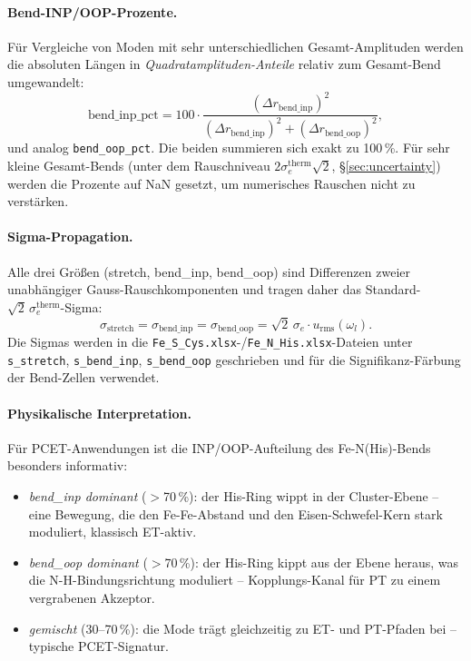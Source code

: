 \documentclass[11pt,a4paper,twoside]{article}
\newcommand{\urms}{u_{\mathrm{rms}}}
\theoremstyle{remark}
\begin{document}
\paragraph{Bend-INP/OOP-Prozente.}
F\"ur Vergleiche von Moden mit sehr unterschiedlichen
Gesamt-Amplituden werden die absoluten L\"angen in
\emph{Quadratamplituden-Anteile} relativ zum Gesamt-Bend umgewandelt:
\begin{equation}
  \text{bend\_inp\_pct} = 100 \cdot
     \frac{(\Delta r_\text{bend\_inp})^2}
          {(\Delta r_\text{bend\_inp})^2 + (\Delta r_\text{bend\_oop})^2},
\end{equation}
und analog \texttt{bend\_oop\_pct}. Die beiden summieren sich
exakt zu 100\,\%. F\"ur sehr kleine Gesamt-Bends (unter dem
Rauschniveau $2\sigma_e^\text{therm}\sqrt{2}$,
\S\ref{sec:uncertainty}) werden die Prozente auf NaN gesetzt,
um numerisches Rauschen nicht zu verst\"arken.

\paragraph{Sigma-Propagation.}
Alle drei Gr\"o\ss en (stretch, bend\_inp, bend\_oop) sind
Differenzen zweier unabh\"angiger Gauss-Rauschkomponenten und tragen
daher das Standard-$\sqrt{2}\,\sigma_e^\text{therm}$-Sigma:
\begin{equation}
  \sigma_\text{stretch} = \sigma_\text{bend\_inp}
  = \sigma_\text{bend\_oop}
  = \sqrt{2}\,\sigma_e \cdot \urms(\omega_l).
\end{equation}
Die Sigmas werden in die
\texttt{Fe\_S\_Cys.xlsx}-/\texttt{Fe\_N\_His.xlsx}-Dateien unter
\texttt{s\_stretch}, \texttt{s\_bend\_inp}, \texttt{s\_bend\_oop}
geschrieben und f\"ur die Signifikanz-F\"arbung der Bend-Zellen
verwendet.

\paragraph{Physikalische Interpretation.}
F\"ur PCET-Anwendungen ist die INP/OOP-Aufteilung des
Fe-N(His)-Bends besonders informativ:
\begin{itemize}\setlength{\itemsep}{0pt}
  \item \emph{bend\_inp dominant} ($>$70\,\%): der His-Ring wippt
        in der Cluster-Ebene -- eine Bewegung, die den
        Fe-Fe-Abstand und den Eisen-Schwefel-Kern stark moduliert,
        klassisch ET-aktiv.
  \item \emph{bend\_oop dominant} ($>$70\,\%): der His-Ring kippt
        aus der Ebene heraus, was die N-H-Bindungsrichtung
        moduliert -- Kopplungs-Kanal f\"ur PT zu einem vergrabenen
        Akzeptor.
  \item \emph{gemischt} (30--70\,\%): die Mode tr\"agt gleichzeitig
        zu ET- und PT-Pfaden bei -- typische PCET-Signatur.
\end{itemize}
\end{document}
